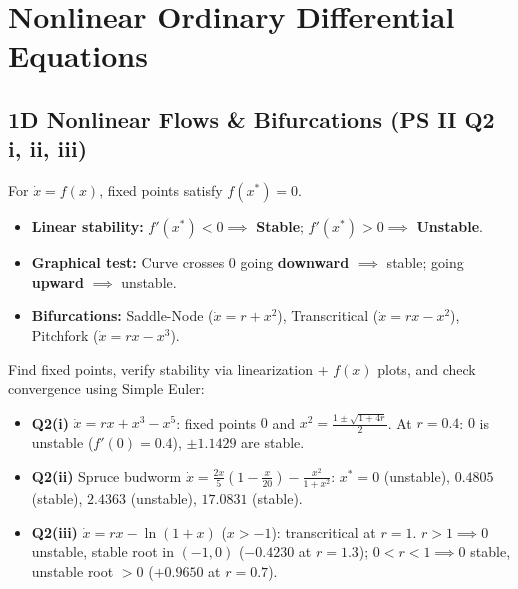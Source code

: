 \documentclass[10pt,a4paper]{article}
\begin{document}
\section{Nonlinear Ordinary Differential Equations}

\subsection{1D Nonlinear Flows \& Bifurcations (PS II Q2 i, ii, iii)}
\begin{theorybox}
For $\dot x = f(x)$, fixed points satisfy $f(x^*) = 0$.
\begin{itemize}
\item \textbf{Linear stability:} $f'(x^*) < 0 \implies$ \textbf{Stable}; \quad $f'(x^*) > 0 \implies$ \textbf{Unstable}.
\item \textbf{Graphical test:} Curve crosses $0$ going \textbf{downward} $\implies$ stable; going \textbf{upward} $\implies$ unstable.
\item \textbf{Bifurcations:} Saddle-Node ($\dot x = r + x^2$), Transcritical ($\dot x = rx - x^2$), Pitchfork ($\dot x = rx - x^3$).
\end{itemize}
\end{theorybox}

\begin{goalbox}
Find fixed points, verify stability via linearization + $f(x)$ plots, and check convergence using Simple Euler:
\begin{itemize}
\item \textbf{Q2(i)} $\dot x = rx + x^3 - x^5$: fixed points $0$ and $x^2 = \frac{1\pm\sqrt{1+4r}}{2}$. At $r=0.4$: $0$ is unstable ($f'(0)=0.4$), $\pm 1.1429$ are stable.
\item \textbf{Q2(ii)} Spruce budworm $\dot x = \frac{2x}{5}(1-\frac{x}{20}) - \frac{x^2}{1+x^2}$: $x^* = 0$ (unstable), $0.4805$ (stable), $2.4363$ (unstable), $17.0831$ (stable).
\item \textbf{Q2(iii)} $\dot x = rx - \ln(1+x)$ ($x>-1$): transcritical at $r=1$. $r>1 \implies 0$ unstable, stable root in $(-1,0)$ ($-0.4230$ at $r=1.3$); $0<r<1 \implies 0$ stable, unstable root $>0$ ($+0.9650$ at $r=0.7$).
\end{itemize}
\end{goalbox}
\end{document}
